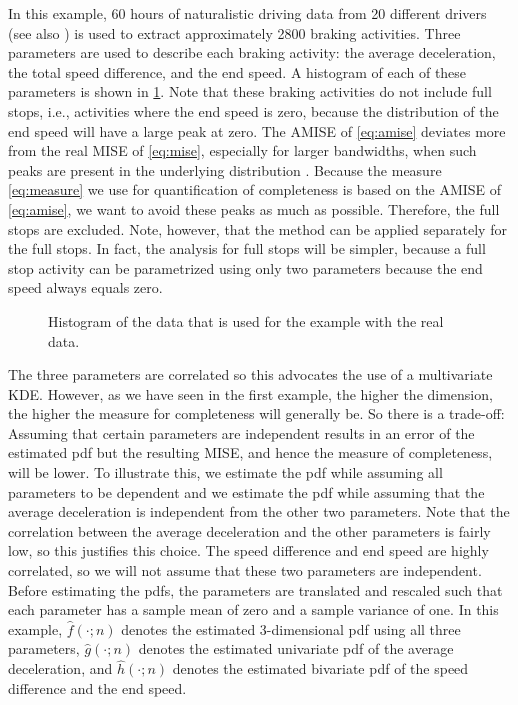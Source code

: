 In this example, 60 hours of naturalistic driving data from 20 different drivers (see also \textcite{deGelder2017assessment}) is used to extract approximately 2800 braking activities. Three parameters are used to describe each braking activity: the average deceleration, the total speed difference, and the end speed. A histogram of each of these parameters is shown in \cref{fig:histogram}. Note that these braking activities do not include full stops, i.e., activities where the end speed is zero, because the distribution of the end speed will have a large peak at zero. The AMISE of \cref{eq:amise} deviates more from the real MISE of \cref{eq:mise}, especially for larger bandwidths, when such peaks are present in the underlying distribution \cite{marron1992exact}. Because the measure \cref{eq:measure} we use for quantification of completeness is based on the AMISE of \cref{eq:amise}, we want to avoid these peaks as much as possible. Therefore, the full stops are excluded.
Note, however, that the method can be applied separately for the full stops. In fact, the analysis for full stops will be simpler, because a full stop activity can be parametrized using only two parameters because the end speed always equals zero. 

\setlength{}
\setlength{}
\begin{figure}
	\centering
	
	\caption{Histogram of the data that is used for the example with the real data.}
	\label{fig:histogram}
\end{figure}

The three parameters are correlated so this advocates the use of a multivariate KDE. However, as we have seen in the first example, the higher the dimension, the higher the measure for completeness will generally be. So there is a trade-off: Assuming that certain parameters are independent results in an error of the estimated pdf but the resulting MISE, and hence the measure of completeness, will be lower. To illustrate this, we estimate the pdf while assuming all parameters to be dependent and we estimate the pdf while assuming that the average deceleration is independent from the other two parameters. Note that the correlation between the average deceleration and the other parameters is fairly low, so this justifies this choice. The speed difference and end speed are highly correlated, so we will not assume that these two parameters are independent. Before estimating the pdfs, the parameters are translated and rescaled such that each parameter has a sample mean of zero and a sample variance of one. In this example, $\hat{f}(\cdot;n)$ denotes the estimated 3-dimensional pdf using all three parameters, $\hat{g}(\cdot;n)$ denotes the estimated univariate pdf of the average deceleration, and $\hat{h}(\cdot;n)$ denotes the estimated bivariate pdf of the speed difference and the end speed.

